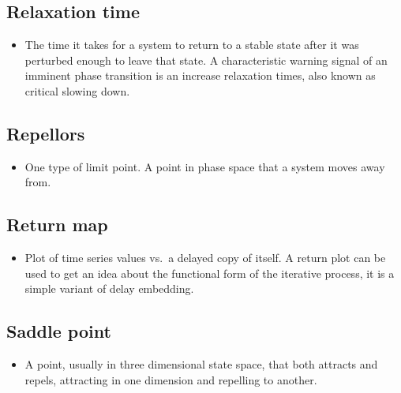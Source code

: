 \documentclass[12pt,]{book}
\providecommand{\tightlist}{%
  \setlength{\itemsep}{0pt}\setlength{\parskip}{0pt}}
\begin{document}
\hypertarget{Rela60}{%
\subsection*{\texorpdfstring{\textbf{Relaxation time}}{Relaxation time}}\label{Rela60}}

\begin{itemize}
\tightlist
\item
  The time it takes for a system to return to a stable state after it was perturbed enough to leave that state. A characteristic warning signal of an imminent phase transition is an increase relaxation times, also known as critical slowing down.
\end{itemize}

\hypertarget{Repe61}{%
\subsection*{\texorpdfstring{\textbf{Repellors}}{Repellors}}\label{Repe61}}

\begin{itemize}
\tightlist
\item
  One type of limit point. A point in phase space that a system moves away from.
\end{itemize}

\hypertarget{Retu62}{%
\subsection*{\texorpdfstring{\textbf{Return map}}{Return map}}\label{Retu62}}

\begin{itemize}
\tightlist
\item
  Plot of time series values vs.~a delayed copy of itself. A return plot can be used to get an idea about the functional form of the iterative process, it is a simple variant of delay embedding.
\end{itemize}

\hypertarget{Sadd63}{%
\subsection*{\texorpdfstring{\textbf{Saddle point}}{Saddle point}}\label{Sadd63}}

\begin{itemize}
\tightlist
\item
  A point, usually in three dimensional state space, that both attracts and repels, attracting in one dimension and repelling to another.
\end{itemize}
\end{document}
